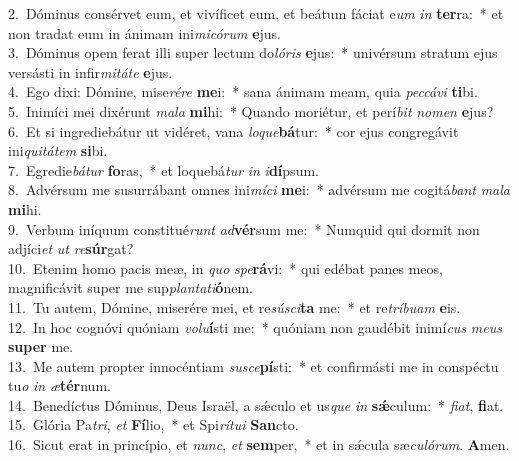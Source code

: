 {2.~}Dóminus consérvet eum, et vivíficet eum, et beátum fáciat e\textit{um} \textit{in} \textbf{ter}ra:~* et non tradat eum in ánimam ini\textit{mi}\textit{có}\textit{rum} \textbf{e}jus.\\
{3.~}Dóminus opem ferat illi super lectum do\textit{ló}\textit{ris} \textbf{e}jus:~* univérsum stratum ejus versásti in infir\textit{mi}\textit{tá}\textit{te} \textbf{e}jus.\\
{4.~}Ego dixi: Dómine, mise\textit{ré}\textit{re} \textbf{me}i:~* sana ánimam meam, quia \textit{pec}\textit{cá}\textit{vi} \textbf{ti}bi.\\
{5.~}Inimíci mei dixérunt \textit{ma}\textit{la} \textbf{mi}hi:~* Quando moriétur, et perí\textit{bit} \textit{no}\textit{men} \textbf{e}jus?\\
{6.~}Et si ingrediebátur ut vidéret, vana \textit{lo}\textit{que}\textbf{bá}tur:~* cor ejus congregávit ini\textit{qui}\textit{tá}\textit{tem} \textbf{si}bi.\\
{7.~}Egredie\textit{bá}\textit{tur} \textbf{fo}ras,~* et loquebá\textit{tur} \textit{in} \textit{i}\textbf{dí}psum.\\
{8.~}Advérsum me susurrábant omnes ini\textit{mí}\textit{ci} \textbf{me}i:~* advérsum me cogitá\textit{bant} \textit{ma}\textit{la} \textbf{mi}hi.\\
{9.~}Verbum iníquum constitué\textit{runt} \textit{ad}\textbf{vér}sum me:~* Numquid qui dormit non adjíci\textit{et} \textit{ut} \textit{re}\textbf{súr}gat?\\
{10.~}Etenim homo pacis meæ, in \textit{quo} \textit{spe}\textbf{rá}vi:~* qui edébat panes meos, magnificávit super me sup\textit{plan}\textit{ta}\textit{ti}\textbf{ó}nem.\\
{11.~}Tu autem, Dómine, miserére mei, et re\textit{sú}\textit{sci}\textbf{ta} me:~* et re\textit{trí}\textit{bu}\textit{am} \textbf{e}is.\\
{12.~}In hoc cognóvi quóniam \textit{vo}\textit{lu}\textbf{í}sti me:~* quóniam non gaudébit inimí\textit{cus} \textit{me}\textit{us} \textbf{su}\textbf{per} me.\\
{13.~}Me autem propter innocéntiam \textit{su}\textit{sce}\textbf{pí}sti:~* et confirmásti me in conspéctu tu\textit{o} \textit{in} \textit{æ}\textbf{tér}num.\\
{14.~}Benedíctus Dóminus, Deus Israël, a sǽculo et us\textit{que} \textit{in} \textbf{sǽ}culum:~* \textit{fi}\textit{at}, \textbf{fi}at.\\
{15.~}Glória Pa\textit{tri}, \textit{et} \textbf{Fí}lio,~* et Spi\textit{rí}\textit{tu}\textit{i} \textbf{San}cto.\\
{16.~}Sicut erat in princípio, et \textit{nunc}, \textit{et} \textbf{sem}per,~* et in sǽcula sæ\textit{cu}\textit{ló}\textit{rum}. \textbf{A}men.\\
